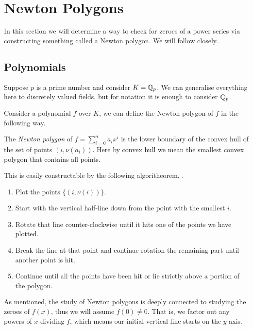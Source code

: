 \section{Newton Polygons}

In this section we will determine a way to check for zeroes of a power series via constructing
something called a Newton polygon. We will follow \cite[Section~7.4]{Gouvea} closely.

\subsection{Polynomials}

Suppose $p$ is a prime number and consider $K = \mathbb{Q}_p$. We can generalise everything here to
discretely valued fields, but for notation it is enough to consider $\mathbb{Q}_p$.

Consider a polynomial $f$ over $K$, we can define the Newton polygon of $f$ in the following way.

\begin{definition}
    The \emph{Newton polygon} of $f = \sum_{i=0}^n a_i x^i$ is the lower boundary of the convex hull
    of the set of points $(i,\nu(a_i))$.
    Here by convex hull we mean the smallest convex polygon that contains all points.
\end{definition}

This is easily constructable by the following algoritheorem, \cite[Pages~210-211]{Gouvea} .

\begin{enumerate}
    \item Plot the points $\{(i,\nu (i) )\}$.
    \item Start with the vertical half-line down from the point with the smallest $i$.
    \item Rotate that line counter-clockwise until it hits one of the points we have plotted.
    \item Break the line at that point and continue rotation the remaining part until another point
    is hit.
    \item Continue until all the points have been hit or lie strictly above a portion of the
    polygon.
\end{enumerate}

As mentioned, the study of Newton polygons is deeply connected to studying the zeroes of $f(x)$,
thus we will assume $f(0) \neq 0$. That is, we factor out any powers of $x$ dividing $f$, which
means our initial vertical line starts on the $y$-axis.

